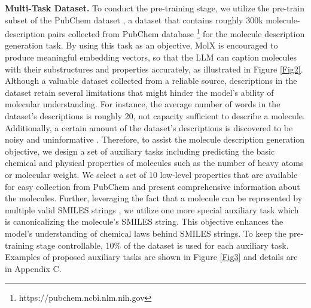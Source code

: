 \noindent
\textbf{Multi-Task Dataset.} To conduct the pre-training stage, we utilize the pre-train subset of the PubChem dataset \cite{li2023towards}, a dataset that contains roughly 300k molecule-description pairs collected from PubChem database \footnote{https://pubchem.ncbi.nlm.nih.gov} for the molecule description generation task. By using this task as an objective, MolX is encouraged to produce meaningful embedding vectors, so that the LLM can caption molecules with their substructures and properties accurately, as illustrated in Figure \ref{Fig2}. Although a valuable dataset collected from a reliable source, descriptions in the dataset retain several limitations that might hinder the model’s ability of molecular understanding. For instance, the average number of words in the dataset’s descriptions is roughly 20, not capacity sufficient to describe a molecule. Additionally, a certain amount of the dataset’s descriptions is discovered to be noisy and uninformative \cite{li2023towards}. Therefore, to assist the molecule description generation objective, we design a set of auxiliary tasks including predicting the basic chemical and physical properties of molecules such as the number of heavy atoms or molecular weight. We select a set of 10 low-level properties that are available for easy collection from PubChem and present comprehensive information about the molecules. Further, leveraging the fact that a molecule can be represented by multiple valid SMILES strings \cite{bjerrum2018improving}, we utilize one more special auxiliary task which is canonicalizing the molecule’s SMILES string. This objective enhances the model’s understanding of chemical laws behind SMILES strings. To keep the pre-training stage controllable, 10\% of the dataset is used for each auxiliary task. Examples of proposed auxiliary tasks are shown in Figure \ref{Fig3} and details are in Appendix C. 

